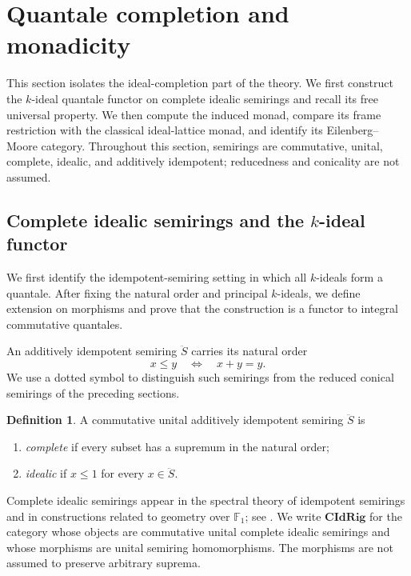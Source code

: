 \documentclass[12pt,leqno]{amsart}
\newcommand{\CIdRig}{\mathbf{CIdRig}}
\theoremstyle{definition}
\newtheorem{definition}{Definition}[section]
\numberwithin{equation}{section}
\theoremstyle{remark}
\def\leq{\leqslant}
\begin{document}
\section{Quantale completion and monadicity}\label{sec:quantale-completion}

This section isolates the ideal-completion part of the theory. We first construct the $k$-ideal quantale functor on complete idealic semirings and recall its free universal property. We then compute the induced monad, compare its frame restriction with the classical ideal-lattice monad, and identify its Eilenberg--Moore category. Throughout this section, semirings are commutative, unital, complete, idealic, and additively idempotent; reducedness and conicality are not assumed.

\subsection{Complete idealic semirings and the \texorpdfstring{$k$}{k}-ideal functor}

We first identify the idempotent-semiring setting in which all $k$-ideals form a quantale. After fixing the natural order and principal $k$-ideals, we define extension on morphisms and prove that the construction is a functor to integral commutative quantales.

An additively idempotent semiring \(\ddot S\) carries its natural order
\[
x\leq y\quad\Longleftrightarrow\quad x+y=y.
\]
We use a dotted symbol to distinguish such semirings from the reduced conical semirings of the preceding sections.

\begin{definition}\label{def:complete-idealic-semiring}
A commutative unital additively idempotent semiring \(\ddot S\) is
\begin{enumerate}
\item \emph{complete} if every subset has a supremum in the natural order;
\item \emph{idealic} if \(x\leq1\) for every \(x\in\ddot S\).
\end{enumerate}
\end{definition}

Complete idealic semirings appear in the spectral theory of idempotent semirings and in constructions related to geometry over \(\mathds{F}_1\); see \cite{Takagi,Ray22}. We write \(\CIdRig\) for the category whose objects are commutative unital complete idealic semirings and whose morphisms are unital semiring homomorphisms. The morphisms are not assumed to preserve arbitrary suprema.
\end{document}
